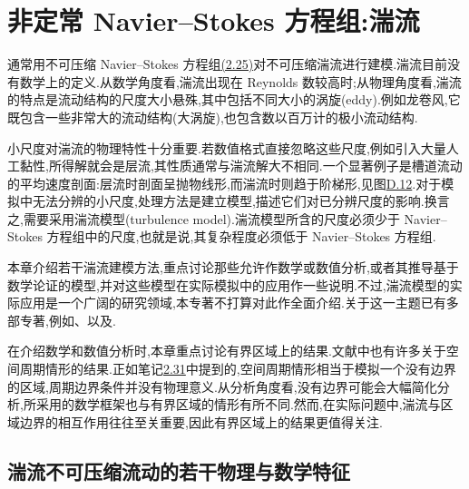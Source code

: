\chapter{非定常 Navier--Stokes 方程组:湍流}
\label{chap:turbulent-flows}

\begin{note}[湍流]
\label{note:turbulent-flows}
通常用不可压缩 Navier--Stokes 方程组\hyperref[eq:incompressible-navier-stokes]{(2.25)}对不可压缩湍流进行建模.湍流目前没有数学上的定义.从数学角度看,湍流出现在 Reynolds 数较高时;从物理角度看,湍流的特点是流动结构的尺度大小悬殊,其中包括不同大小的涡旋(eddy).例如龙卷风,它既包含一些非常大的流动结构(大涡旋),也包含数以百万计的极小流动结构.

小尺度对湍流的物理特性十分重要.若数值格式直接忽略这些尺度,例如引入大量人工黏性,所得解就会是层流,其性质通常与湍流解大不相同.一个显著例子是槽道流动的平均速度剖面:层流时剖面呈抛物线形,而湍流时则趋于阶梯形,见图\hyperref[fig:appendix-d-12]{D.12}.对于模拟中无法分辨的小尺度,处理方法是建立模型,描述它们对已分辨尺度的影响.换言之,需要采用湍流模型(turbulence model).湍流模型所含的尺度必须少于 Navier--Stokes 方程组中的尺度,也就是说,其复杂程度必须低于 Navier--Stokes 方程组.
\end{note}



\begin{note}[本章内容]
\label{note:turbulence-chapter-contents}
本章介绍若干湍流建模方法,重点讨论那些允许作数学或数值分析,或者其推导基于数学论证的模型,并对这些模型在实际模拟中的应用作一些说明.不过,湍流模型的实际应用是一个广阔的研究领域,本专著不打算对此作全面介绍.关于这一主题已有多部专著,例如\textcite{Sagaut2006}、\textcite{LesieurMetaisComte2005}以及\textcite{FerzigerPeric1999}.

在介绍数学和数值分析时,本章重点讨论有界区域上的结果.文献中也有许多关于空间周期情形的结果.正如笔记\hyperref[note:infinite-periodic-boundary]{2.31}中提到的,空间周期情形相当于模拟一个没有边界的区域,周期边界条件并没有物理意义.从分析角度看,没有边界可能会大幅简化分析,所采用的数学框架也与有界区域的情形有所不同.然而,在实际问题中,湍流与区域边界的相互作用往往至关重要,因此有界区域上的结果更值得关注.
\end{note}

\section{湍流不可压缩流动的若干物理与数学特征}
\label{sec:turbulence-characteristics}\label{sec:turbulence}

